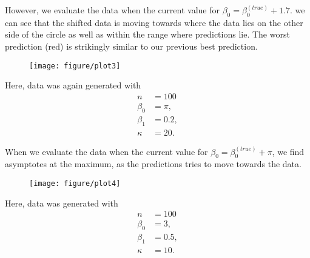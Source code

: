 \documentclass{article}\usepackage[]{graphicx}\usepackage[]{color}
\makeatletter
\def\maxwidth{ %
  \ifdim\Gin@nat@width>\linewidth
    \linewidth
  \else
    \Gin@nat@width
  \fi
}
\newenvironment{knitrout}{}{} %
\makeatother
\begin{document}
However, we evaluate the data when the current value for $\beta_0= \beta_0^{(true)} + 1.7$. we can see that the shifted data is moving towards where the data lies on the other side of the circle as well as within the range where predictions lie. The worst prediction (red) is strikingly similar to our previous best prediction.

\newpage

\begin{figure}[t!]
\begin{knitrout}
\color{fgcolor}

{\centering \texttt{[image: figure/plot3]} 

}



\end{knitrout}

\end{figure}


Here, data was again generated with
\begin{align*}
n &= 100 \\
\beta_0 &= \pi, \\
\beta_1 &= 0.2, \\
\kappa &= 20.
\end{align*}

When we evaluate the data when the current value for $\beta_0= \beta_0^{(true)} + \pi$,  we find asymptotes at the maximum, as the predictions tries to move towards the data.


\newpage

\begin{figure}[t!]
\begin{knitrout}
\color{fgcolor}

{\centering \texttt{[image: figure/plot4]} 

}



\end{knitrout}

\end{figure}


Here, data was generated with
\begin{align*}
n &= 100 \\
\beta_0 &= 3, \\
\beta_1 &= 0.5, \\
\kappa &= 10.
\end{align*}
\end{document}
